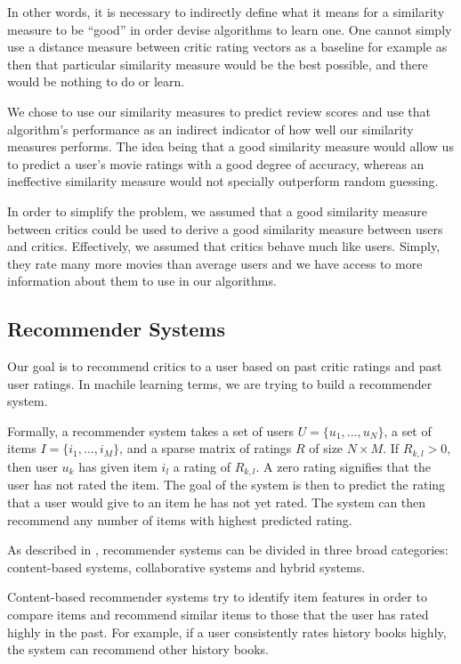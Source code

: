\documentclass[12pt]{article}
\begin{document}
In other words, it is necessary to indirectly define what it means for a
similarity measure to be ``good'' in order devise algorithms to learn one. One
cannot simply use a distance measure between critic rating vectors as a
baseline for example as then that particular similarity measure would be the
best possible, and there would be nothing to do or learn.

We chose to use our similarity measures to predict review scores and use that
algorithm's performance as an indirect indicator of how well our similarity
measures performs. The idea being that a good similarity measure would allow
us to predict a user's movie ratings with a good degree of accuracy, whereas an
ineffective similarity measure would not specially outperform random guessing.

In order to simplify the problem, we assumed that a good similarity measure
between critics could be used to derive a good similarity measure
between users and critics. Effectively, we assumed that critics behave much
like users. Simply, they rate many more movies than average users and we have
access to more information about them to use in our algorithms.

\subsection{Recommender Systems}

Our goal is to recommend critics to a user
based on past critic ratings and past user ratings. In machile learning terms,
we are trying to build a recommender system.

Formally, a recommender system takes a set of users $U = \{u_1, ..., u_N\}$, a
set of items $I = \{i_1, ..., i_M\}$, and a sparse matrix of ratings
$R$ of size $N \times M$. If $R_{k,l} > 0$, then user $u_k$ has given item
$i_l$ a rating of $R_{k,l}$. A zero rating signifies that the
user has not rated the item. The goal of the system is then to predict the
rating that a user would give to an item he has not yet rated. The system can
then recommend any number of items with highest predicted rating.

As described in \cite{Survey05}, recommender systems can be divided in three
broad categories: content-based systems, collaborative systems and hybrid
systems. 

Content-based recommender systems try to identify item features in order to
compare items and recommend similar items to those that the user has rated
highly in the past.  For example, if a user consistently rates history books
highly, the system can recommend other history books.
\end{document}
